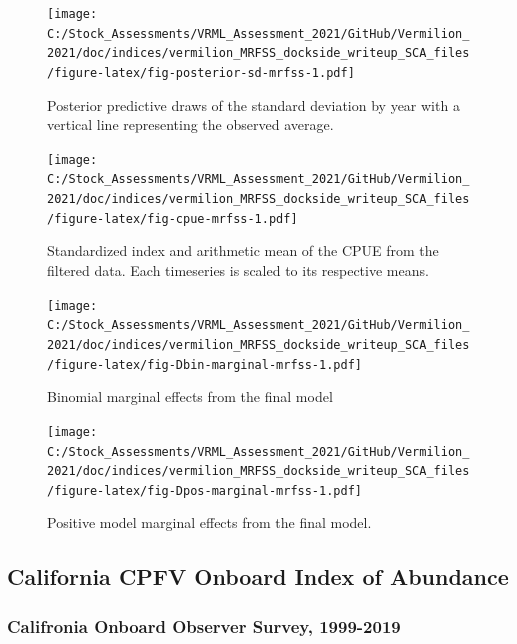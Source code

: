 \documentclass[11pt,
  english,
  a4paper,
]{article}
\begin{document}
\begin{figure}
\centering
\texttt{[image: C:/Stock\_Assessments/VRML\_Assessment\_2021/GitHub/Vermilion\_2021/doc/indices/vermilion\_MRFSS\_dockside\_writeup\_SCA\_files/figure-latex/fig-posterior-sd-mrfss-1.pdf]}
\caption{\label{fig:fig-posterior-sd-mrfss}Posterior predictive draws of the standard deviation by year with a vertical line representing the observed average.}
\end{figure}

\begin{figure}
\centering
\texttt{[image: C:/Stock\_Assessments/VRML\_Assessment\_2021/GitHub/Vermilion\_2021/doc/indices/vermilion\_MRFSS\_dockside\_writeup\_SCA\_files/figure-latex/fig-cpue-mrfss-1.pdf]}
\caption{\label{fig:fig-cpue-mrfss}Standardized index and arithmetic mean of the CPUE from the filtered data. Each timeseries is scaled to its respective means.}
\end{figure}

\begin{figure}
\centering
\texttt{[image: C:/Stock\_Assessments/VRML\_Assessment\_2021/GitHub/Vermilion\_2021/doc/indices/vermilion\_MRFSS\_dockside\_writeup\_SCA\_files/figure-latex/fig-Dbin-marginal-mrfss-1.pdf]}
\caption{\label{fig:fig-Dbin-marginal-mrfss}Binomial marginal effects from the final model}
\end{figure}

\begin{figure}
\centering
\texttt{[image: C:/Stock\_Assessments/VRML\_Assessment\_2021/GitHub/Vermilion\_2021/doc/indices/vermilion\_MRFSS\_dockside\_writeup\_SCA\_files/figure-latex/fig-Dpos-marginal-mrfss-1.pdf]}
\caption{\label{fig:fig-Dpos-marginal-mrfss}Positive model marginal effects from the final model.}
\end{figure}

\clearpage


\hypertarget{cpfv-index}{%
\subsection{California CPFV Onboard Index of Abundance}\label{cpfv-index}}

\leavevmode\tagmcend\tagstructend


\hypertarget{califronia-onboard-observer-survey-1999-2019}{%
\subsubsection{Califronia Onboard Observer Survey, 1999-2019}\label{califronia-onboard-observer-survey-1999-2019}}
\end{document}
